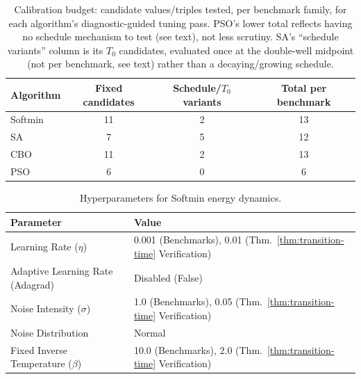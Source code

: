 \documentclass{opt2026} %
\begin{document}
\begin{table}[!htbp]
\centering
\caption{Calibration budget: candidate values/triples tested, per benchmark family, for each algorithm's diagnostic-guided tuning pass. PSO's lower total reflects having no schedule mechanism to test (see text), not less scrutiny. SA's ``schedule variants'' column is its $T_0$ candidates, evaluated once at the double-well midpoint (not per benchmark, see text) rather than a decaying/growing schedule.}
\label{tab:calibration_budget}
\begin{tabular}{@{}lccc@{}}
\toprule
\textbf{Algorithm} & \textbf{Fixed candidates} & \textbf{Schedule/$T_0$ variants} & \textbf{Total per benchmark} \\
\midrule
Softmin & 11 & 2 & 13 \\
SA & 7 & 5 & 12 \\
CBO & 11 & 2 & 13 \\
PSO & 6 & 0 & 6 \\
\bottomrule
\end{tabular}
\end{table}

\begin{table}[!htbp]
\centering
\caption{Hyperparameters for Softmin energy dynamics.}
\label{tab:softmin_hyperparams}
\begin{tabular}{@{}ll@{}}
\toprule
\textbf{Parameter} & \textbf{Value} \\
\midrule
Learning Rate ($\eta$) & 0.001 (Benchmarks), 0.01 (Thm.~\ref{thm:transition-time} Verification) \\
Adaptive Learning Rate (Adagrad) & Disabled (False) \\
Noise Intensity ($\sigma$) & 1.0 (Benchmarks), 0.05 (Thm.~\ref{thm:transition-time} Verification) \\
Noise Distribution & Normal \\
Fixed Inverse Temperature ($\beta$) & 10.0 (Benchmarks), 2.0 (Thm.~\ref{thm:transition-time} Verification) \\
\bottomrule
\end{tabular}
\end{table}
\end{document}
